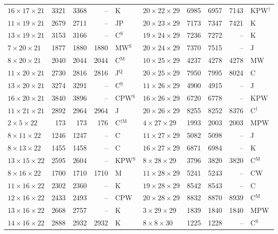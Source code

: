 \begin{longtable}{@{}lrrrl@{\hspace{6mm}}lrrrl@{}}
$16{\times}17{\times}21$ & 3321 & 3368 & -- & K & $20{\times}22{\times}29$ & 6985 & 6957 & 7143 & KPW$^{\dagger}$\\
$11{\times}19{\times}21$ & 2679 & 2711 & -- & JP & $20{\times}23{\times}29$ & 7173 & 7347 & 7421 & K\\
$13{\times}19{\times}21$ & 3153 & 3166 & -- & C$^{\mathrm{S}}$ & $19{\times}24{\times}29$ & 7236 & 7272 & -- & K\\
$7{\times}20{\times}21$ & 1877 & 1880 & 1880 & MW$^{\mathrm{S}}$ & $20{\times}24{\times}29$ & 7370 & 7515 & -- & J\\
$8{\times}20{\times}21$ & 2040 & 2044 & 2044 & C$^{\mathrm{M}}$ & $10{\times}25{\times}29$ & 4237 & 4278 & 4278 & MW\\
$11{\times}20{\times}21$ & 2730 & 2816 & 2816 & J$^{\mathrm{Q}}$ & $20{\times}25{\times}29$ & 7950 & 7995 & 8024 & C\\
$13{\times}20{\times}21$ & 3274 & 3291 & -- & C$^{\mathrm{S}}$ & $11{\times}26{\times}29$ & 4900 & 4915 & -- & J\\
$16{\times}20{\times}21$ & 3840 & 3896 & -- & CPW$^{\mathrm{S}}$ & $16{\times}26{\times}29$ & 6720 & 6778 & -- & KPW\\
$11{\times}21{\times}21$ & 2892 & 2964 & 2964 & J & $20{\times}26{\times}29$ & 8255 & 8252 & 8376 & C$^{\dagger}$\\
$2{\times}5{\times}22$ & 173 & 173 & 176 & C$^{\dagger\mathrm{M}}$ & $4{\times}27{\times}29$ & 1993 & 2003 & 2003 & MPW\\
$8{\times}11{\times}22$ & 1246 & 1247 & -- & C & $11{\times}27{\times}29$ & 5082 & 5098 & -- & J\\
$8{\times}13{\times}22$ & 1455 & 1458 & -- & C & $16{\times}27{\times}29$ & 6871 & 6984 & -- & K\\
$13{\times}15{\times}22$ & 2595 & 2604 & -- & KPW$^{\mathrm{S}}$ & $8{\times}28{\times}29$ & 3796 & 3820 & 3820 & C$^{\mathrm{M}}$\\
$8{\times}16{\times}22$ & 1700 & 1710 & 1710 & M & $11{\times}28{\times}29$ & 5241 & 5243 & -- & CW\\
$11{\times}16{\times}22$ & 2302 & 2360 & -- & K & $19{\times}28{\times}29$ & 8542 & 8543 & -- & C\\
$12{\times}16{\times}22$ & 2433 & 2493 & -- & CPW & $20{\times}28{\times}29$ & 8832 & 8870 & 8939 & C$^{\mathrm{M}}$\\
$13{\times}16{\times}22$ & 2668 & 2757 & -- & K & $3{\times}29{\times}29$ & 1839 & 1840 & 1840 & MPW\\
$14{\times}16{\times}22$ & 2888 & 2932 & 2932 & K & $8{\times}8{\times}30$ & 1225 & 1228 & -- & C$^{\mathrm{S}}$\\

\end{longtable}
